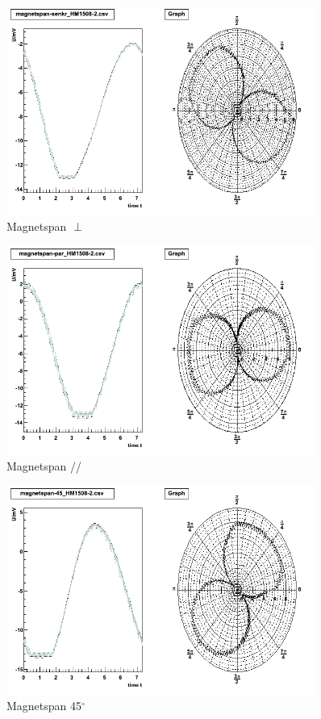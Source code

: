 \begin{appendix}
\begin{figure}[H]
	\centering \includegraphics[width=0.9\textwidth]{Auswertung/Proben-polar/magnetspan-senkr.png}
	\caption{Magnetspan $\perp$}
\end{figure}

\begin{figure}[H]
	\centering \includegraphics[width=0.9\textwidth]{Auswertung/Proben-polar/magnetspan-par.png}
	\caption{Magnetspan //}
\end{figure}

\begin{figure}[H]
	\centering \includegraphics[width=0.9\textwidth]{Auswertung/Proben-polar/magnetspan-45.png}
	\caption{Magnetspan 45$^\circ$}
\end{figure}


\end{appendix}
